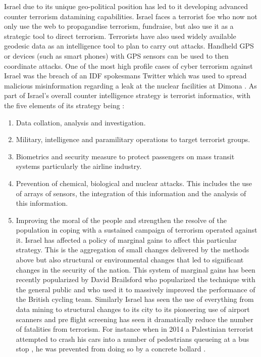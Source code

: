 Israel due to its unique geo-political position has led to it developing advanced counter terrorism datamining capabilities. Israel faces a terrorist foe who now not only use the web to propagandise terrorism, fundraise,  but also use it as a strategic tool to direct terrorism. Terrorists have also used widely available geodesic data  as an intelligence tool to plan to carry out attacks. Handheld GPS or devices (such as smart phones) with GPS sensors can be used to then coordinate attacks. One of the most high profile cases of cyber terrorism against Israel was the breach of an IDF  spokesmans Twitter which was used to spread  malicious misinformation regarding a leak at the nuclear facilities at Dimona \citep{Israeltwitterhack}.
As part of Israel's overall counter intelligence strategy is terrorist informatics, with the five elements of its strategy being \citep{tucker2003strategies}:
\begin{enumerate}
	\item Data collation, analysis and investigation.
	\item Military, intelligence and paramilitary operations to target terrorist groups.
	\item Biometrics and security measure to protect passengers on mass transit systems particularly the airline industry.
	\item Prevention of chemical, biological and nuclear attacks. This includes the use of arrays of sensors, the integration of this information and the analysis of this information.
	\item Improving the moral of the people and strengthen the resolve of the population in coping with a sustained campaign of terrorism operated against it. Israel has affected a policy of marginal gains to affect this particular strategy. This is the aggregation of small changes delivered by the methods above but also structural or environmental changes that led to significant changes in the security of the nation. This system of marginal gains has been recently popularized by David Brailsford who popularized the technique with the general public \citep{durrand2014pre} and who used it to massively improved the performance of the British cycling team. Similarly Israel has seen the use of everything from data mining to structural changes to its city to its pioneering use of airport scanners and pre flight screening has seen it dramatically reduce the number of fatalities from terrorism. For instance when in 2014 a Palestinian terrorist attempted to crash his cars into a number of pedestrians queueing at a bus stop , he was prevented from doing so by a concrete bollard \citep{Israelcounterterrorismlesson}. 
\end{enumerate}
